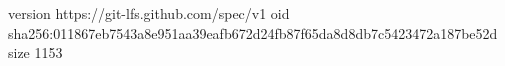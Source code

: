version https://git-lfs.github.com/spec/v1
oid sha256:011867eb7543a8e951aa39eafb672d24fb87f65da8d8db7c5423472a187be52d
size 1153
